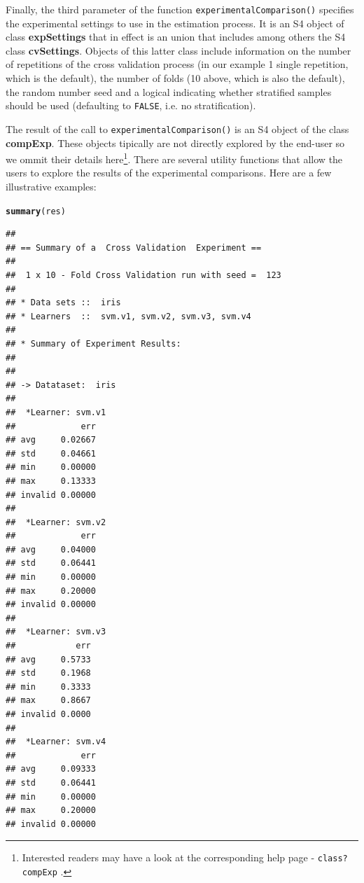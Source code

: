 \documentclass[10pt,a4paper]{article}\usepackage[]{graphicx}\usepackage[]{color}
\makeatletter
\newcommand{\hlstd}[1]{\textcolor[rgb]{0.345,0.345,0.345}{#1}}%
\newcommand{\hlkwd}[1]{\textcolor[rgb]{0.737,0.353,0.396}{\textbf{#1}}}%
\newenvironment{kframe}{%
 \def\at@end@of@kframe{}%
 \ifinner\ifhmode%
  \def\at@end@of@kframe{\end{minipage}}%
  \begin{minipage}{\columnwidth}%
 \fi\fi%
 \def\FrameCommand##1{\hskip\@totalleftmargin \hskip-\fboxsep
 \colorbox{shadecolor}{##1}\hskip-\fboxsep
     \hskip-\linewidth \hskip-\@totalleftmargin \hskip\columnwidth}%
 \MakeFramed {\advance\hsize-\width
   \@totalleftmargin\z@ \linewidth\hsize
   \@setminipage}}%
 {\par\unskip\endMakeFramed%
 \at@end@of@kframe}
\newenvironment{knitrout}{}{} %
\makeatother
\begin{document}
Finally, the third parameter of the function
\texttt{experimentalComparison()} specifies the experimental settings
to use in the estimation process. It is an S4 object of class
\textbf{expSettings} that in effect is an union that includes among
others the S4 class \textbf{cvSettings}. Objects of this latter class
include information on the number of repetitions of the cross
validation process (in our example 1 single repetition, which is the
default), the number of folds (10 above, which is also the default),
the random number seed and a logical indicating whether stratified
samples should be used (defaulting to \texttt{FALSE}, i.e. no stratification).

The result of the call to \texttt{experimentalComparison()} is an S4
object of the class \textbf{compExp}. These objects tipically are not
 directly explored by the end-user so we ommit their
details here\footnote{Interested readers may have a look at the corresponding
  help page - \texttt{class?compExp} .}. There are several utility
functions that allow the users to explore the results of the
experimental comparisons. Here are a few illustrative examples:




\begin{knitrout}
\color{fgcolor}\begin{kframe}
\begin{alltt}
\hlkwd{summary}\hlstd{(res)}
\end{alltt}


{\ttfamily\noindent\itshape\color{messagecolor}{\#\# Loading required package: DMwR\\\#\# Loading required package: lattice\\\#\# Loading required package: grid}}\begin{verbatim}
## 
## == Summary of a  Cross Validation  Experiment ==
## 
##  1 x 10 - Fold Cross Validation run with seed =  123 
## 
## * Data sets ::  iris
## * Learners  ::  svm.v1, svm.v2, svm.v3, svm.v4
## 
## * Summary of Experiment Results:
## 
## 
## -> Datataset:  iris 
## 
## 	*Learner: svm.v1 
##             err
## avg     0.02667
## std     0.04661
## min     0.00000
## max     0.13333
## invalid 0.00000
## 
## 	*Learner: svm.v2 
##             err
## avg     0.04000
## std     0.06441
## min     0.00000
## max     0.20000
## invalid 0.00000
## 
## 	*Learner: svm.v3 
##            err
## avg     0.5733
## std     0.1968
## min     0.3333
## max     0.8667
## invalid 0.0000
## 
## 	*Learner: svm.v4 
##             err
## avg     0.09333
## std     0.06441
## min     0.00000
## max     0.20000
## invalid 0.00000
\end{verbatim}
\end{kframe}
\end{knitrout}
\end{document}
